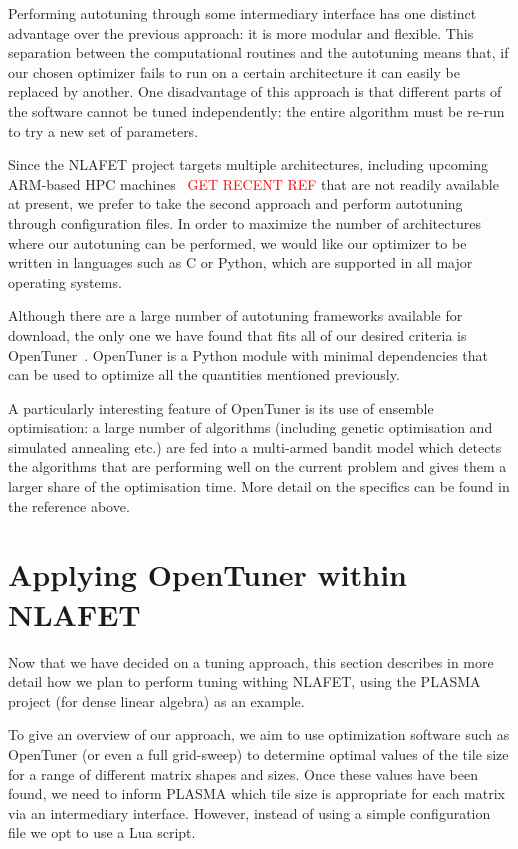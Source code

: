 \documentclass[a4paper,12pt]{article}
\begin{document}
Performing autotuning through some intermediary interface
has one distinct advantage over the previous approach:
it is more modular and flexible.
This separation between the computational routines and the
autotuning means that,
if our chosen optimizer fails to run on a certain architecture
it can easily be replaced by another.
One disadvantage of this approach is that different parts of the software
cannot be tuned independently:
the entire algorithm must be re-run to try a new set of parameters.

Since the NLAFET project targets multiple architectures, including
upcoming ARM-based HPC machines~\cite{seal2001arm} \textcolor{red}{GET
  RECENT REF} that are not
readily available at present, we prefer to take the second approach
and perform autotuning through configuration files.  In order to
maximize the number of architectures where our autotuning can be
performed, we would like our optimizer to be written in languages such
as C or Python, which are supported in all major operating systems.

Although there are a large number of autotuning frameworks
available for download,
the only one we have found that fits all of our desired
criteria is OpenTuner~\cite{ansel:pact:2014}.
OpenTuner is a Python module with minimal dependencies that
can be used to optimize all the quantities mentioned previously.

A particularly interesting feature of OpenTuner
is its use of ensemble optimisation:
a large number of algorithms
(including genetic optimisation and simulated annealing etc.)
are fed into a multi-armed bandit model
which detects the algorithms that are performing well on the current
problem and gives them a larger share of the optimisation time.
More detail on the specifics can be found in the reference above.

\section{Applying OpenTuner within NLAFET}
\label{sec:opentuner}
Now that we have decided on a tuning approach,
this section describes in more detail how we plan to
perform tuning withing NLAFET,
using the PLASMA project (for dense linear algebra)
as an example.

To give an overview of our approach,
we aim to use optimization software such as OpenTuner
(or even a full grid-sweep)
to determine optimal values of the tile size for
a range of different matrix shapes and sizes.
Once these values have been found,
we need to inform PLASMA which tile size is appropriate for
each matrix via an intermediary interface.
However,
instead of using a simple configuration file
we opt to use a Lua script.
\end{document}
